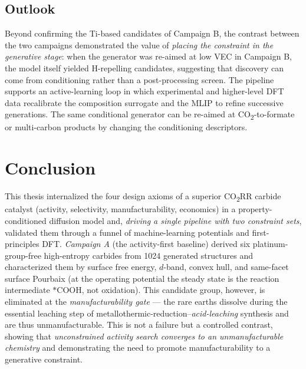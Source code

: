 \documentclass[11pt,a4paper]{report}
\begin{document}
\section{Outlook}
Beyond confirming the Ti-based candidates of Campaign B, the contrast between the two campaigns demonstrated the
value of \emph{placing the constraint in the generative stage}: when the generator was re-aimed at low VEC in
Campaign B, the model itself yielded H-repelling candidates, suggesting that discovery can come from conditioning
rather than a post-processing screen. The pipeline supports an active-learning loop in which experimental and
higher-level DFT data recalibrate the composition surrogate and the MLIP to refine successive generations. The same
conditional generator can be re-aimed at CO\textsubscript{2}-to-formate or multi-carbon products by changing the
conditioning descriptors.

\chapter{Conclusion}
\label{ch:conclusion}

This thesis internalized the four design axioms of a superior CO\textsubscript{2}RR carbide catalyst (activity,
selectivity, manufacturability, economics) in a property-conditioned diffusion model and, \emph{driving a single
pipeline with two constraint sets}, validated them through a funnel of machine-learning potentials and first-principles
DFT. \emph{Campaign A} (the activity-first baseline) derived six platinum-group-free high-entropy carbides from 1024
generated structures and characterized them by surface free energy, $d$-band, convex hull, and same-facet surface
Pourbaix (at the operating potential the steady state is the reaction intermediate $*$COOH, not oxidation). This
candidate group, however, is eliminated at the \emph{manufacturability gate} --- the rare earths dissolve during the
essential leaching step of metallothermic-reduction--\emph{acid-leaching} synthesis and are thus unmanufacturable.
This is not a failure but a controlled contrast, showing that \emph{unconstrained activity search converges to an
unmanufacturable chemistry} and demonstrating the need to promote manufacturability to a generative constraint.
\end{document}
